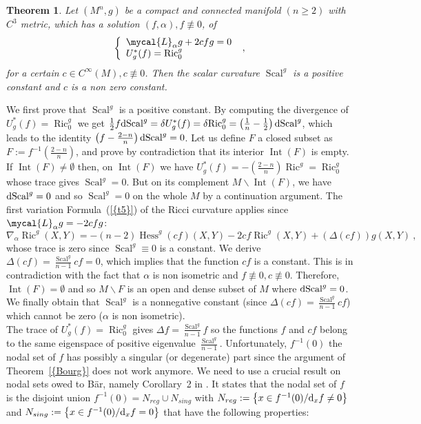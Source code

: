 \documentclass[a4paper,11pt,leqno]{amsart}
\numberwithin{equation}{section}
\theoremstyle{main}
\newtheorem{thm} {\bf  Theorem} [section]
\begin{document}
\begin{thm}\label{cmc2}
	Let  $(M^n, g)$ be a compact and connected manifold $(n\ge2)$ with $C^3$ metric, which has a solution $(f,\alpha), f\not\equiv0$, of
$$ \left\{
\begin{array}{l}
	 \mycal{L}_\alpha g+ 2cfg= 0 \\
	 U_g^* (f)={\operatorname{Ric}}^g_0
\end{array}\right. \ ,$$
for a certain $c\in C^{\infty}(M), c\not\equiv 0$. Then the scalar curvature ${\operatorname{Scal}}^g$ is a positive constant and $c$ is a non zero constant.
\end{thm}
\proof We first prove that ${\operatorname{Scal}}^g$ is a positive constant. By computing the divergence of $ U_g^* (f)={\operatorname{Ric}}^g_0$ we get
$\frac{1}{2}f {{\rm d}} {\operatorname{Scal}}^g=\delta U_g^* (f)=\delta{\operatorname{Ric}}^g_0=\left(\frac{1}{n}-\frac{1}{2}\right){{\rm d}}{\operatorname{Scal}}^g $, which leads to the identity $\left(f-\frac{2-n}{n}\right){{\rm d}}{\operatorname{Scal}}^g=0$. Let us define $F$ a closed subset as $F:=f^{-1}\left(\frac{2-n}{n}\right)$, and prove by contradiction that its interior ${\operatorname{Int}}(F)$ is empty. If ${\operatorname{Int}}(F)\neq\emptyset$ then, on ${\operatorname{Int}}(F)$  we have $U_g^* (f)=-\left(\frac{2-n}{n}\right){\operatorname{Ric}}^g={\operatorname{Ric}}^g_0$ whose trace gives ${\operatorname{Scal}}^g=0$. But on its complement $M\smallsetminus {\operatorname{Int}}(F)$, we have ${{\rm d}}{\operatorname{Scal}}^g=0$ and so ${\operatorname{Scal}}^g=0$ on the whole $M$ by a continuation argument. The first variation Formula~({\ref{{t5}}}) of the Ricci curvature applies since $\mycal{L}_\alpha g=- 2cfg$:
$$ \nabla_\alpha {\operatorname{Ric}}^g (X,Y)= -(n-2){\operatorname{Hess}}^g (cf)(X,Y) - 2cf {\operatorname{Ric}}^g (X,Y) + (\Delta (cf))g(X,Y) \ ,$$
whose trace is zero since ${\operatorname{Scal}}^g\equiv0$ is a constant. We derive $\Delta (cf)=\frac{{\operatorname{Scal}}^g}{n-1}cf=0$, which implies that the function $cf$ is a constant. This is in contradiction with the fact that $\alpha$ is non isometric and $f\not\equiv0, c\not\equiv0$. Therefore, ${\operatorname{Int}}(F)=\emptyset$ and so $M\smallsetminus F$ is an open and dense subset of $M$ where ${{\rm d}}{\operatorname{Scal}}^g=0$. We finally obtain that ${\operatorname{Scal}}^g$ is a nonnegative constant (since $\Delta (cf)=\frac{{\operatorname{Scal}}^g}{n-1}cf$) which cannot be zero ($\alpha$ is non isometric).\\
The trace of $ U_g^* (f)={\operatorname{Ric}}^g_0$ gives $\Delta f=\frac{{\operatorname{Scal}}^g}{n-1}f$ so the functions $f$ and $cf$ belong to the same eigenspace of positive eigenvalue $\frac{{\operatorname{Scal}}^g}{n-1}$. Unfortunately, $f^{-1}(0)$ the nodal set of $f$ has possibly a singular (or degenerate) part since the argument of Theorem~{\ref{{Bourg}}} does not work anymore. We need to use a crucial result on nodal sets owed to Bär, namely Corollary~2 in \cite{Baer}. It states that the nodal set of $f$ is the disjoint union $f^{-1}(0)=N_{reg}\cup N_{sing}$ with $N_{reg}:=\left\{x\in f^{-1}(0)/ {{\rm d}}_x f\neq 0\right\}$ and $N_{sing}:=\left\{x\in f^{-1}(0)/ {{\rm d}}_x f = 0\right\}$ that have the following properties:
\end{document}
